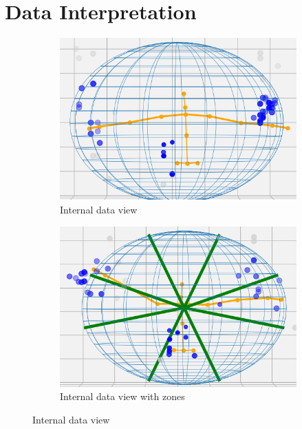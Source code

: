 \section{Data Interpretation}
\label{section: tracking method - data interpretation}

\begin{figure}[h]

    \begin{subfigure}{0.5\textwidth}
        \includegraphics[width=0.9\linewidth]{figures/internal data/IAmMuse internal view.png}
        \caption{Internal data view}
        \label{figure: internal data view, a}
    \end{subfigure}
    \begin{subfigure}{0.5\textwidth}
        \includegraphics[width=0.9\linewidth]{figures/internal data/IAmMuse internal view with zones.png}
        \caption{Internal data view with zones}
        \label{figure: internal data view, b}
    \end{subfigure}
    
    \caption{Internal data view}
    \label{figure: internal data view}
\end{figure}
